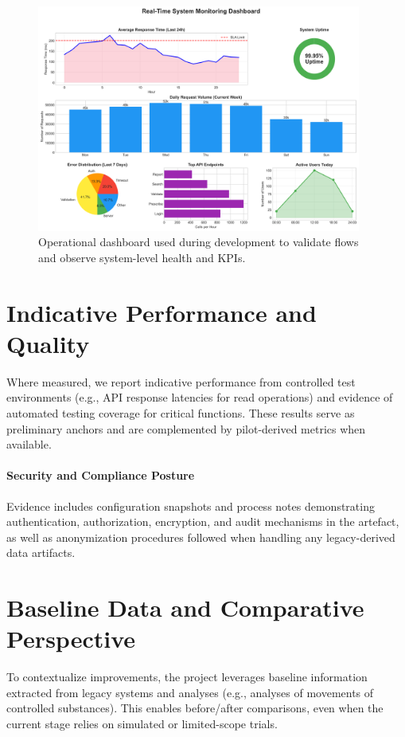 \begin{figure}[htbp]
    \centering
    \includegraphics[width=0.95\textwidth]{images/generated/monitoring_dashboard.png}
    \caption{Operational dashboard used during development to validate flows and observe system-level health and KPIs.}
    \label{fig:monitoring_dashboard}
\end{figure}

\section{Indicative Performance and Quality}
Where measured, we report indicative performance from controlled test environments (e.g., API response latencies for read operations) and evidence of automated testing coverage for critical functions. These results serve as preliminary anchors and are complemented by pilot-derived metrics when available.

\paragraph{Security and Compliance Posture}
Evidence includes configuration snapshots and process notes demonstrating authentication, authorization, encryption, and audit mechanisms in the artefact, as well as anonymization procedures followed when handling any legacy-derived data artifacts.

\section{Baseline Data and Comparative Perspective}
To contextualize improvements, the project leverages baseline information extracted from legacy systems and analyses (e.g., analyses of movements of controlled substances). This enables before/after comparisons, even when the current stage relies on simulated or limited-scope trials.

